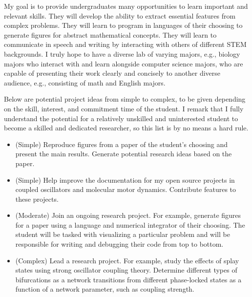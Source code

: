 \documentclass[a4paper,11pt]{article}
\begin{document}
	My goal is to provide undergraduates many opportunities to learn important and relevant skills. They will develop the ability to extract essential features from complex problems. They will learn to program in languages of their choosing to generate figures for abstract mathematical concepts. They will learn to communicate in speech and writing by interacting with others of different STEM backgrounds. I truly hope to have a diverse lab of varying majors, e.g., biology majors who interact with and learn alongside computer science majors, who are capable of presenting their work clearly and concisely to another diverse audience, e.g., consisting of math and English majors.
	
	Below are potential project ideas from simple to complex, to be given depending on the skill, interest, and commitment time of the student. I remark that I fully understand the potential for a relatively unskilled and uninterested student to become a skilled and dedicated researcher, so this list is by no means a hard rule.
	
	\begin{itemize}
		\item (Simple) Reproduce figures from a paper of the student's choosing and present the main results. Generate potential research ideas based on the paper.
		\item (Simple) Help improve the documentation for my open source projects in coupled oscillators and molecular motor dynamics. Contribute features to these projects.
		\item (Moderate) Join an ongoing research project. For example, generate figures for a paper using a language and numerical integrator of their choosing. The student will be tasked with visualizing a particular problem and will be responsible for writing and debugging their code from top to bottom.
		\item (Complex) Lead a research project. For example, study the effects of splay states using strong oscillator coupling theory. Determine different types of bifurcations as a network transitions from different phase-locked states as a function of a network parameter, such as coupling strength.
	\end{itemize}
	
	
\end{document}
